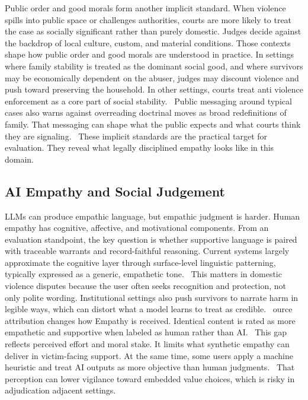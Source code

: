 {{{{Public order and good morals form another implicit standard. When violence spills into public space or challenges authorities, courts are more likely to treat the case as socially significant rather than purely domestic. Judges decide against the backdrop of local culture, custom, and material conditions. Those contexts shape how public order and good morals are understood in practice. In settings where family stability is treated as the dominant social good, and where survivors may be economically dependent on the abuser, judges may discount violence and push toward preserving the household. In other settings, courts treat anti violence enforcement as a core part of social stability.~\cite{ref71} Public messaging around typical cases also warns against overreading doctrinal moves as broad redefinitions of family. That messaging can shape what the public expects and what courts think they are signaling.~\cite{ref72} These implicit standards are the practical target for evaluation. They reveal what legally disciplined empathy looks like in this domain.

\hypertarget{ai-empathy-and-social-judgement}{%
\subsection{AI Empathy and Social Judgement}\label{ai-empathy-and-social-judgement}

LLMs can produce empathic language, but empathic judgment is harder. Human empathy has cognitive, affective, and motivational components. From an evaluation standpoint, the key question is whether supportive language is paired with traceable warrants and record-faithful reasoning. Current systems largely approximate the cognitive layer through surface-level linguistic patterning, typically expressed as a generic, empathetic tone.~\cite{ref73} This matters in domestic violence disputes because the user often seeks recognition and protection, not only polite wording. Institutional settings also push survivors to narrate harm in legible ways, which can distort what a model learns to treat as credible.~\cite{ref74} ource attribution changes how Empathy is received. Identical content is rated as more empathetic and supportive when labeled as human rather than AI.~\cite{ref75} This gap reflects perceived effort and moral stake. It limits what synthetic empathy can deliver in victim-facing support. At the same time, some users apply a machine heuristic and treat AI outputs as more objective than human judgments.~\cite{ref76} That perception can lower vigilance toward embedded value choices, which is risky in adjudication adjacent settings.

}}}}}
